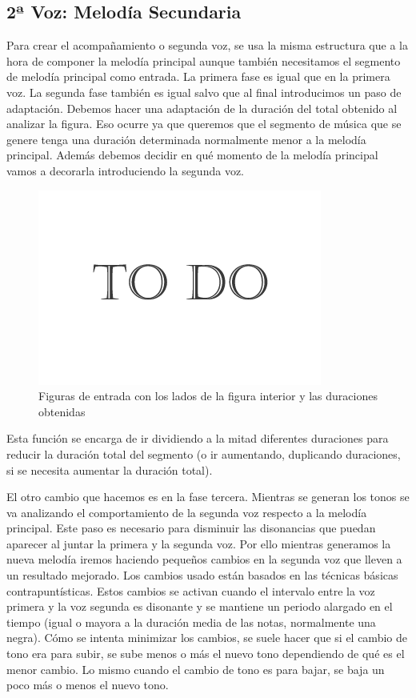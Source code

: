\subsection{2ª Voz: Melodía Secundaria}

Para crear el acompañamiento o segunda voz, se usa la misma estructura que a la hora de componer la melodía principal aunque también necesitamos el segmento de melodía principal como entrada. 
La primera fase es igual que en la primera voz. La segunda fase también es igual salvo que al final introducimos un paso de adaptación. Debemos hacer una adaptación de la duración del total obtenido al analizar la figura. Eso ocurre ya que queremos que el segmento de música que se genere tenga una duración determinada normalmente menor a la melodía principal. Además debemos decidir en qué momento de la melodía principal vamos a decorarla introduciendo la segunda voz.

 		\begin{figure}[htbp]
		\centering
		\hspace*{0.0in}
		\includegraphics[scale=0.57]{graphics/todo.png}
		\caption{Figuras de entrada con los lados de la figura interior y las duraciones obtenidas}
		\label{fig:Figura1Voz2}
		\end{figure}

Esta función se encarga de ir dividiendo a la mitad diferentes duraciones para reducir la duración total del segmento (o ir aumentando, duplicando duraciones, si se necesita aumentar la duración total). 

El otro cambio que hacemos es en la fase tercera. Mientras se generan los tonos se va analizando el comportamiento de la segunda voz respecto a la melodía principal. Este paso es necesario para disminuir las disonancias que puedan aparecer al juntar la primera y la segunda voz. Por ello mientras generamos la nueva melodía iremos haciendo pequeños cambios en la segunda voz que lleven a un resultado mejorado. Los cambios usado están basados en las técnicas básicas contrapuntísticas. Estos cambios se activan cuando el intervalo entre la voz primera y la voz segunda es disonante y se mantiene un periodo alargado en el tiempo (igual o mayora a la duración media de las notas, normalmente una negra). Cómo se intenta minimizar los cambios, se suele hacer que si el cambio de tono era para subir, se sube menos o más el nuevo tono dependiendo de qué es el menor cambio. Lo mismo cuando el cambio de tono es para bajar, se baja un poco más o menos el nuevo tono.

